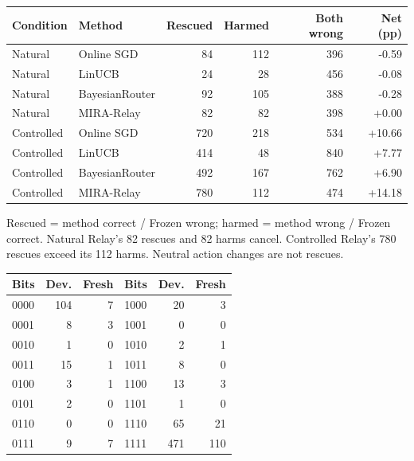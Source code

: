 \documentclass[10pt,letterpaper]{article}
\newcommand{\note}[1]{{\fontsize{8.5}{10.5}\selectfont #1\par}}
\newcommand{\sect}[1]{\vspace{5pt}{\large\bfseries #1}\par\vspace{2pt}}
\newenvironment{clean}{\begin{center}\fontsize{9.5}{11.5}\selectfont\setlength{\tabcolsep}{6pt}\renewcommand{\arraystretch}{1.06}}{\end{center}}
\begin{document}
\par\noindent\begin{minipage}{\linewidth}\end{minipage}\par
\begin{clean}\begin{tabular}{@{}llrrrr@{}}
\toprule
Condition & Method & Rescued & Harmed & Both wrong & Net (pp) \\
\midrule
Natural & Online SGD & 84 & 112 & 396 & -0.59 \\
Natural & LinUCB & 24 & 28 & 456 & -0.08 \\
Natural & BayesianRouter & 92 & 105 & 388 & -0.28 \\
Natural & MIRA-Relay & 82 & 82 & 398 & +0.00 \\
Controlled & Online SGD & 720 & 218 & 534 & +10.66 \\
Controlled & LinUCB & 414 & 48 & 840 & +7.77 \\
Controlled & BayesianRouter & 492 & 167 & 762 & +6.90 \\
Controlled & MIRA-Relay & 780 & 112 & 474 & +14.18 \\
\bottomrule\end{tabular}\end{clean}
\note{Rescued = method correct / Frozen wrong; harmed = method wrong / Frozen correct. Natural Relay's 82 rescues and 82 harms cancel. Controlled Relay's 780 rescues exceed its 112 harms. Neutral action changes are not rescues.}
\sect{Joint provider difficulty: preserve the actual dependence}
\par\noindent\begin{minipage}{\linewidth}\end{minipage}\par
\begin{clean}\begin{tabular}{@{}lrrlrr@{}}
\toprule
Bits & Dev. & Fresh & Bits & Dev. & Fresh \\
\midrule
0000 & 104 & 7 & 1000 & 20 & 3 \\
0001 & 8 & 3 & 1001 & 0 & 0 \\
0010 & 1 & 0 & 1010 & 2 & 1 \\
0011 & 15 & 1 & 1011 & 8 & 0 \\
0100 & 3 & 1 & 1100 & 13 & 3 \\
0101 & 2 & 0 & 1101 & 1 & 0 \\
0110 & 0 & 0 & 1110 & 65 & 21 \\
0111 & 9 & 7 & 1111 & 471 & 110 \\
\bottomrule\end{tabular}\end{clean}
\end{document}
